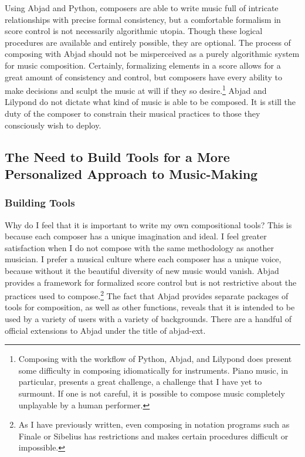 Using Abjad and Python, composers are able to write music full of intricate relationships with precise formal consistency, but a comfortable formalism in score control is not necessarily algorithmic utopia. Though these logical procedures are available and entirely possible, they are optional. The process of composing with Abjad should not be misperceived as a purely algorithmic system for music composition. Certainly, formalizing elements in a score allows for a great amount of consistency and control, but composers have every ability to make decisions and sculpt the music at will if they so desire.\footnote{Composing with the workflow of Python, Abjad, and Lilypond does present some difficulty in composing idiomatically for instruments. Piano music, in particular, presents a great challenge, a challenge that I have yet to surmount. If one is not careful, it is possible to compose music completely unplayable by a human performer.} Abjad and Lilypond do not dictate what kind of music is able to be composed. It is still the duty of the composer to constrain their musical practices to those they consciously wish to deploy.

\subsection{The Need to Build Tools for a More Personalized Approach to Music-Making}

\subsubsection{Building Tools}

Why do I feel that it is important to write my own compositional tools? This is because each composer has a unique imagination and ideal. I feel greater satisfaction when I do not compose with the same methodology as another musician. I prefer a musical culture where each composer has a unique voice, because without it the beautiful diversity of new music would vanish. Abjad provides a framework for formalized score control but is not restrictive about the practices used to compose.\footnote{As I have previously written, even composing in notation programs such as Finale or Sibelius has restrictions and makes certain procedures difficult or impossible.} The fact that Abjad provides separate packages of tools for composition, as well as other functions, reveals that it is intended to be used by a variety of users with a variety of backgrounds. There are a handful of official extensions to Abjad under the title of abjad-ext.

